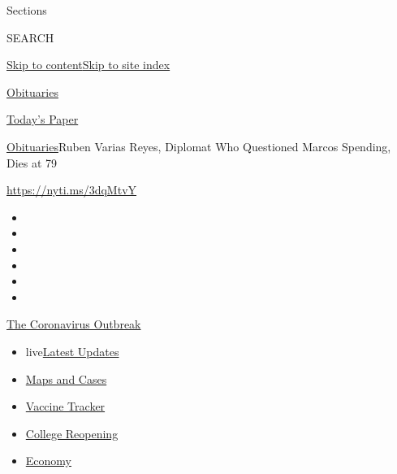 Sections

SEARCH

\protect\hyperlink{site-content}{Skip to
content}\protect\hyperlink{site-index}{Skip to site index}

\href{https://www.nytimes.com/section/obituaries}{Obituaries}

\href{https://myaccount.nytimes.com/auth/login?response_type=cookie\&client_id=vi}{}

\href{https://www.nytimes.com/section/todayspaper}{Today's Paper}

\href{/section/obituaries}{Obituaries}\textbar{}Ruben Varias Reyes,
Diplomat Who Questioned Marcos Spending, Dies at 79

\url{https://nyti.ms/3dqMtvY}

\begin{itemize}
\item
\item
\item
\item
\item
\item
\end{itemize}

\href{https://www.nytimes.com/news-event/coronavirus?action=click\&pgtype=Article\&state=default\&region=TOP_BANNER\&context=storylines_menu}{The
Coronavirus Outbreak}

\begin{itemize}
\tightlist
\item
  live\href{https://www.nytimes.com/2020/08/03/world/coronavirus-covid-19.html?action=click\&pgtype=Article\&state=default\&region=TOP_BANNER\&context=storylines_menu}{Latest
  Updates}
\item
  \href{https://www.nytimes.com/interactive/2020/us/coronavirus-us-cases.html?action=click\&pgtype=Article\&state=default\&region=TOP_BANNER\&context=storylines_menu}{Maps
  and Cases}
\item
  \href{https://www.nytimes.com/interactive/2020/science/coronavirus-vaccine-tracker.html?action=click\&pgtype=Article\&state=default\&region=TOP_BANNER\&context=storylines_menu}{Vaccine
  Tracker}
\item
  \href{https://www.nytimes.com/2020/08/02/us/covid-college-reopening.html?action=click\&pgtype=Article\&state=default\&region=TOP_BANNER\&context=storylines_menu}{College
  Reopening}
\item
  \href{https://www.nytimes.com/live/2020/08/03/business/stock-market-today-coronavirus?action=click\&pgtype=Article\&state=default\&region=TOP_BANNER\&context=storylines_menu}{Economy}
\end{itemize}

